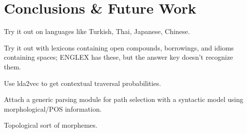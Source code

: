 \chapter{Conclusions \& Future Work}
Try it out on languages like Turkish, Thai, Japanese, Chinese.

Try it out with lexicons containing open compounds, borrowings, and idioms containing spaces; ENGLEX has these, but the answer key doesn't recognize them.

Use lda2vec to get contextual traversal probabilities.

Attach a generic parsing module for path selection with a syntactic model using morphological/POS information.

Topological sort of morphemes.